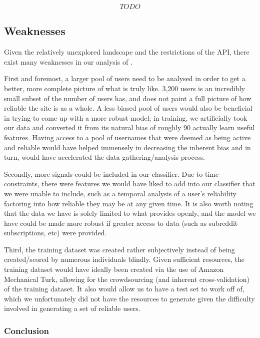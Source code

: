 \[TODO\]
\subsection{Weaknesses}
\label{sub:weaknesses}
Given the relatively unexplored landscape and the restrictions of the \reddit{}
API, there exist many weaknesses in our analysis of \reddit{}.

First and foremost, a larger pool of users need to be analysed in order to get a
better, more complete picture of what \reddit{} is truly like. 3,200 users is an
incredibly small subset of the number of users \reddit{} has, and does not paint
a full picture of how reliable the site is as a whole. A less biased pool of
users would also be beneficial in trying to come up with a more robust model; in
training, we artificially took our data and converted it from its natural bias
of roughly 90%
actually learn useful features. Having access to a pool of usernames that were
deemed as being active and reliable would have helped immensely in decreasing
the inherent bias and in turn, would have accelerated the data
gathering/analysis process.

Secondly, more signals could be included in our classifier. Due to time
constraints, there were features we would have liked to add into our classifier
that we were unable to include, such as a temporal analysis of a user's
reliability factoring into how reliable they may be at any given time. It is
also worth noting that the data we have is solely limited to what \reddit{}
provides openly, and the model we have could be made more robust if greater
access to data (such as subreddit subscriptions, etc) were provided.

Third, the training dataset was created rather subjectively instead of being
created/scored by numerous individuals blindly. Given sufficient resources, the
training dataset would have ideally been created via the use of Amazon
Mechanical Turk, allowing for the crowdsourcing (and inherent cross-validation)
of the training dataset. It also would allow us to have a test set to work off
of, which we unfortunately did not have the resources to generate given the
difficulty involved in generating a set of reliable users.

\subsubsection{Conclusion}

